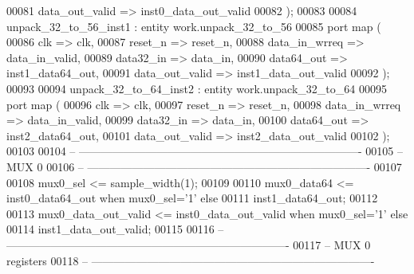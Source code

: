 \begin{DoxyCode}
00081         data\_out\_valid  => inst0_data_out_valid
00082 \textcolor{vhdlchar}{)};
00083 
00084 unpack\_32\_to\_56\_inst1 : \textcolor{keywordflow}{entity} work.unpack\_32\_to\_56 
00085 \textcolor{keywordflow}{port} \textcolor{keywordflow}{map} (
00086        clk              => clk,
00087       reset\_n           => reset_n,
00088         data\_in\_wrreq   => data_in_valid,
00089         data32\_in       => data_in,
00090         data64\_out      => inst1_data64_out,
00091         data\_out\_valid  => inst1_data_out_valid
00092 \textcolor{vhdlchar}{)};
00093 
00094 unpack\_32\_to\_64\_inst2 : \textcolor{keywordflow}{entity} work.unpack\_32\_to\_64 
00095 \textcolor{keywordflow}{port} \textcolor{keywordflow}{map} (
00096        clk              => clk,
00097       reset\_n           => reset_n,
00098         data\_in\_wrreq   => data_in_valid,
00099         data32\_in       => data_in,
00100         data64\_out      => inst2_data64_out,
00101         data\_out\_valid  => inst2_data_out_valid
00102 \textcolor{vhdlchar}{)};
00103 
00104 \textcolor{keyword}{-- ----------------------------------------------------------------------------}
00105 \textcolor{keyword}{-- MUX 0 }
00106 \textcolor{keyword}{-- ----------------------------------------------------------------------------}
00107 
00108 \textcolor{vhdlchar}{mux0_sel}                \textcolor{vhdlchar}{<=} \textcolor{vhdlchar}{sample_width}\textcolor{vhdlchar}{(}\textcolor{vhdllogic}{}\textcolor{vhdllogic}{1}\textcolor{vhdlchar}{)};
00109 
00110 \textcolor{vhdlchar}{mux0_data64}             \textcolor{vhdlchar}{<=} \textcolor{vhdlchar}{inst0_data64_out} \textcolor{keywordflow}{when} \textcolor{vhdlchar}{mux0_sel}\textcolor{vhdlchar}{=}\textcolor{vhdlchar}{'}\textcolor{vhdllogic}{}\textcolor{vhdllogic}{1}\textcolor{vhdlchar}{'} \textcolor{keywordflow}{else} 
00111                                 inst1\_data64\_out;
00112                     
00113 \textcolor{vhdlchar}{mux0_data_out_valid}     \textcolor{vhdlchar}{<=} \textcolor{vhdlchar}{inst0_data_out_valid} \textcolor{keywordflow}{when} \textcolor{vhdlchar}{mux0_sel}\textcolor{vhdlchar}{=}\textcolor{vhdlchar}{'}\textcolor{vhdllogic}{}\textcolor{vhdllogic}{1}\textcolor{vhdlchar}{'} \textcolor{keywordflow}{else} 
00114                                 inst1\_data\_out\_valid;
00115             
00116 \textcolor{keyword}{-- ----------------------------------------------------------------------------}
00117 \textcolor{keyword}{-- MUX 0 registers}
00118 \textcolor{keyword}{-- ----------------------------------------------------------------------------}

\end{DoxyCode}
